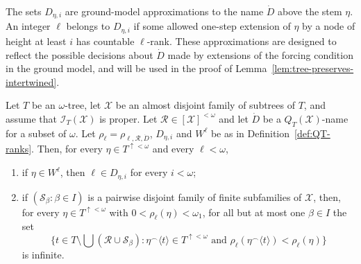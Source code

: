 The sets $D_{\eta,i}$ are ground-model approximations to the name
$\dot D$ above the stem $\eta$.
An integer $\ell$ belongs to $D_{\eta,i}$ if some allowed one-step extension
of $\eta$ by a node of height at least $i$ has countable $\ell$-rank.
These approximations are designed to reflect the possible decisions about
$\dot D$ made by extensions of the forcing condition in the ground model, and will be used in the proof of Lemma~\ref{lem:tree-preserves-intertwined}.


\begin{lemma}\label{lem:QT-rank-facts}
Let $T$ be an $\omega$-tree, let $\mathcal X$ be an almost disjoint family of
subtrees of $T$, and assume that $\mathcal I_T(\mathcal X)$ is proper.
Let $\mathcal R\in[\mathcal X]^{<\omega}$ and let $\dot D$ be a
$Q_T(\mathcal X)$-name for a subset of $\omega$.
Let $\rho_\ell=\rho_{\ell,\mathcal R,\dot D}$, $D_{\eta,i}$ and $W^\ell$ be as in Definition~\ref{def:QT-ranks}.
Then, for every $\eta\in T^{\uparrow<\omega}$ and every $\ell<\omega$,
\begin{enumerate}[label=(\arabic*)]
    \item if $\eta\in W^\ell$, then $\ell\in D_{\eta,i}$ for every
    $i<\omega$;

    \item if $(\mathcal S_\beta:\beta\in I)$ is a pairwise disjoint family of
    finite subfamilies of $\mathcal X$, then, for every
    $\eta\in T^{\uparrow<\omega}$ with $0<\rho_\ell(\eta)<\omega_1$, for all
    but at most one $\beta\in I$ the set
    \[
      \{t\in T\setminus\bigcup(\mathcal R\cup\mathcal S_\beta):
        \eta^\frown\langle t\rangle\in T^{\uparrow<\omega}
        \text{ and }
        \rho_\ell(\eta^\frown\langle t\rangle)<\rho_\ell(\eta)
      \}
    \]
    is infinite.
\end{enumerate}
\end{lemma}


